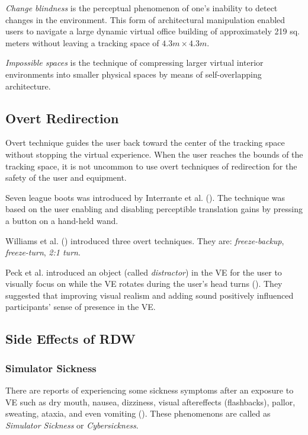 \documentclass[12pt]{article}
\begin{document}
\emph{Change blindness} is the perceptual phenomenon of one's inability to detect changes in the environment. This form of architectural manipulation enabled users to navigate a large dynamic virtual office building of approximately 219 sq. meters without leaving a tracking space of $4.3m \times 4.3m$.

\emph{Impossible spaces} is the technique of compressing larger virtual interior environments into smaller physical spaces by means of self-overlapping architecture.

\subsection{Overt Redirection}

Overt technique guides the user back toward the center of the tracking space without stopping the virtual experience. When the user reaches the bounds of the tracking space, it is not uncommon to use overt techniques of redirection for the safety of the user and equipment.

Seven league boots was introduced by Interrante et al. (\cite{interrante2007seven}). The technique was based on the user enabling and disabling perceptible translation gains by pressing a button on a hand-held wand.

Williams et al. (\cite{williams2007exploring}) introduced three overt techniques. They are: \emph{freeze-backup}, \emph{freeze-turn}, \emph{2:1 turn}.

Peck et al. introduced an object (called \emph{distractor}) in the VE for the user to visually focus on while the VE rotates during the user's head turns (\cite{peck2011evaluation}). They suggested that improving visual realism and adding sound positively influenced participants' sense of presence in the VE.

\subsection{Side Effects of RDW}

\subsubsection{Simulator Sickness}

There are reports of experiencing some sickness symptoms after an exposure to VE such as dry mouth, nausea, dizziness, visual aftereffects (flashbacks), pallor, sweating, ataxia, and even vomiting (\cite{razzaque2005redirected}). These phenomenons are called as \emph{Simulator Sickness} or \emph{Cybersickness}.

\newpage

\printbibliography
\end{document}
